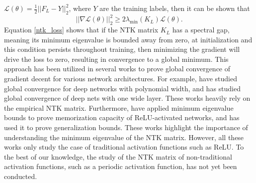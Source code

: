 \documentclass{article}
\theoremstyle{plain}
\theoremstyle{definition}
\theoremstyle{remark}
\begin{document}
$\mathcal{L}(\theta) = \frac{1}{2}\vert\vert F_L - Y\vert\vert_2^2$, where $Y$ are the training labels, then it can be shown that
\begin{equation}\label{ntk_loss}
    \vert\vert \nabla\mathcal{L}(\theta)\vert\vert_2^2 \geq 
    2\lambda_{\min}\left( K_L \right)\mathcal{L}(\theta).
\end{equation}
Equation \eqref{ntk_loss} shows that if the NTK matrix $K_L$ has a spectral gap, meaning its minimum eigenvalue is bounded away from zero, at initialization and this condition persists throughout training, then minimizing the gradient will drive the loss to zero, resulting in convergence to a global minimum. 
This approach has been utilized in several works to prove global convergence of 
gradient decent for various network architectures.
For example, \cite{allen2019convergence, du2019gradient, zou2019improved} have studied global convergence for deep networks with polynomial width, and \cite{nguyen2020global} has
studied global convergence of deep nets with one wide layer. These works heavily rely on the empirical NTK matrix.
Furthermore, \cite{montanari2022interpolation, nguyen2021tight} have applied minimum eigenvalue bounds to prove memorization capacity of ReLU-activated networks, and \cite{arora2019fine, montanari2022interpolation} has used it to 
prove generalization bounds. These works highlight the importance of understanding the minimum eigenvalue of the NTK matrix. However, all these works only study the case of traditional activation functions such as ReLU. To the best of our knowledge, the study of the NTK matrix of non-traditional activation functions, such as a periodic activation function, has not yet been conducted. 
\end{document}
